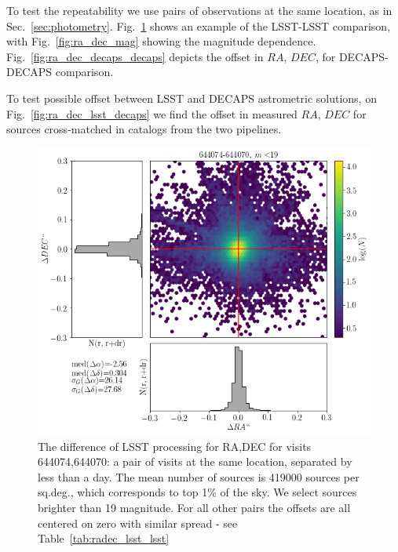 \documentclass[DM,lsstdraft,toc,usenatbib]{lsstdoc}
\begin{document}
To test the repeatability we use pairs of observations at the same location, as in Sec.~\ref{sec:photometry}. Fig.~\ref{fig:ra_dec_lsst_lsst} shows an example of the LSST-LSST comparison, with Fig.~\ref{fig:ra_dec_mag} showing the magnitude dependence. Fig.~\ref{fig:ra_dec_decaps_decaps} depicts the offset in $RA$, $DEC$, for DECAPS-DECAPS comparison. 


To test possible offset between LSST and DECAPS astrometric solutions, on Fig.~\ref{fig:ra_dec_lsst_decaps} we find the offset in measured $RA$, $DEC$ for sources cross-matched in catalogs from the two pipelines. 

\begin{figure}
\begin{centering}
\includegraphics[width=0.8\columnwidth]{figs/lsst644074-644070_RA_DEC_offset_lims.png}
\caption{The difference of LSST processing for  RA,DEC for visits 644074,644070: a pair of visits at the same location, separated by less than a day. The mean number of sources is 419000 sources per sq.deg., which corresponds to top 1\% of the sky.  We select sources brighter than 19 magnitude.  For all other pairs the  offsets are all centered on zero with similar spread - see Table~\ref{tab:radec_lsst_lsst}}
\label{fig:ra_dec_lsst_lsst}
\end{centering}
\end{figure} 
\end{document}

